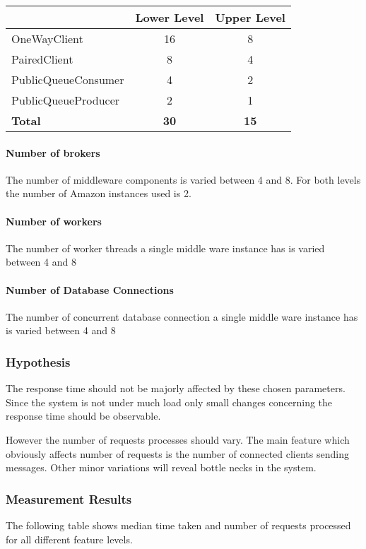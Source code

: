 \documentclass[milestone1.tex]{subfiles}
\begin{document}
\begin{tabular}{|l|c|c|}
\hline 
 & Lower Level & Upper Level \\ 
\hline 
OneWayClient & 16 & 8  \\ 
\hline 
PairedClient & 8 & 4 \\ 
\hline 
PublicQueueConsumer & 4 & 2 \\ 
\hline 
PublicQueueProducer & 2 & 1 \\ 
\hline 
\textbf{Total}  & \textbf{30} & \textbf{15} \\
\hline 
\end{tabular} 

\paragraph{Number of brokers}

The number of middleware components is varied between 4 and 8. For both levels the number of Amazon instances used is 2.

\paragraph{Number of workers}

The number of worker threads a single middle ware instance has is varied between 4 and 8

\paragraph{Number of Database Connections}

The number of concurrent database connection a single middle ware instance has is varied between 4 and 8

\subsubsection{Hypothesis}

The response time should not be majorly affected by these chosen parameters. Since the system is not under much load only small changes concerning the response time should be observable.

However the number of requests processes should vary. The main feature which obviously affects number of requests is the number of connected clients sending messages. Other minor variations will reveal bottle necks in the system.

\subsubsection{Measurement Results}
The following table shows median time taken and number of requests processed for all different feature levels.\\
\end{document}
